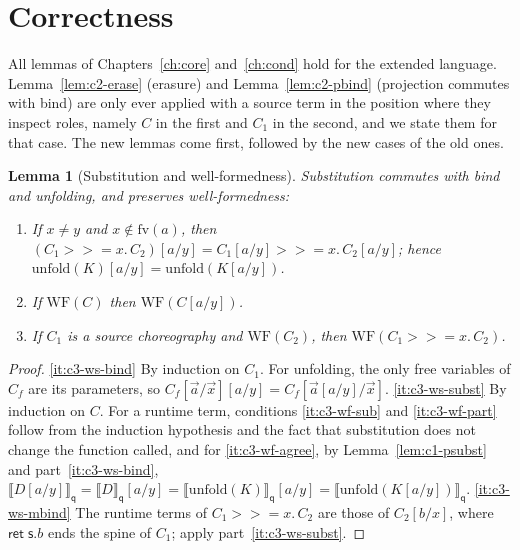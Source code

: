 \documentclass[11pt]{report}
\theoremstyle{plain}
\newtheorem{lemma}[theorem]{Lemma}
\theoremstyle{definition}
\theoremstyle{remark}
\newcommand{\kw}[1]{\mathsf{#1}}
\newcommand{\qq}{\mathsf{q}}
\newcommand{\sr}{\mathsf{s}}
\newcommand{\fv}{\mathrm{fv}}
\newcommand{\cret}[1]{\kw{ret}\;#1}
\newcommand{\mbind}[3]{#1 \mathbin{>\!\!>\!\!=} #2.\,#3}
\newcommand{\unfold}[1]{\mathrm{unfold}(#1)}
\newcommand{\WF}{\mathrm{WF}}
\newcommand{\proj}[2]{\llbracket #1 \rrbracket_{#2}}
\begin{document}
\section{Correctness}
\label{sec:c3-correct}

All lemmas of Chapters~\ref{ch:core} and~\ref{ch:cond} hold for the extended
language.  Lemma~\ref{lem:c2-erase} (erasure) and Lemma~\ref{lem:c2-pbind}
(projection commutes with bind) are only ever applied with a source term in
the position where they inspect roles, namely $C$ in the first and $C_1$ in
the second, and we state them for that case.  The new lemmas come first,
followed by the new cases of the old ones.

\begin{lemma}[Substitution and well-formedness]\label{lem:c3-wfsubst}
  Substitution commutes with bind and unfolding, and preserves
  well-formedness:
  \begin{enumerate}[label=(\roman*),nosep]
  \item\label{it:c3-ws-bind} If $x\neq y$ and $x\notin\fv(a)$, then
    $(\mbind{C_1}{x}{C_2})[a/y]=\mbind{C_1[a/y]}{x}{C_2[a/y]}$; hence
    $\unfold{K}[a/y]=\unfold{K[a/y]}$.
  \item\label{it:c3-ws-subst} If $\WF(C)$ then $\WF(C[a/y])$.
  \item\label{it:c3-ws-mbind} If $C_1$ is a source choreography and $\WF(C_2)$,
    then $\WF(\mbind{C_1}{x}{C_2})$.
  \end{enumerate}
\end{lemma}
\begin{proof}
  \ref{it:c3-ws-bind} By induction on $C_1$.  For unfolding, the only free
  variables of $C_f$ are its parameters, so
  $C_f[\vec a/\vec x][a/y]=C_f[\vec a[a/y]/\vec x]$.
  \ref{it:c3-ws-subst} By induction on $C$.  For a runtime term, conditions
  \ref{it:c3-wf-sub} and \ref{it:c3-wf-part} follow from the induction
  hypothesis and the fact that substitution does not change the function
  called, and for \ref{it:c3-wf-agree}, by Lemma~\ref{lem:c1-psubst} and
  part~\ref{it:c3-ws-bind},
  $\proj{D[a/y]}{\qq}=\proj{D}{\qq}[a/y]=\proj{\unfold{K}}{\qq}[a/y]=\proj{\unfold{K[a/y]}}{\qq}$.
  \ref{it:c3-ws-mbind} The runtime terms of $\mbind{C_1}{x}{C_2}$ are those of
  $C_2[b/x]$, where $\cret{\sr.b}$ ends the spine of $C_1$; apply
  part~\ref{it:c3-ws-subst}.
\end{proof}
\end{document}
